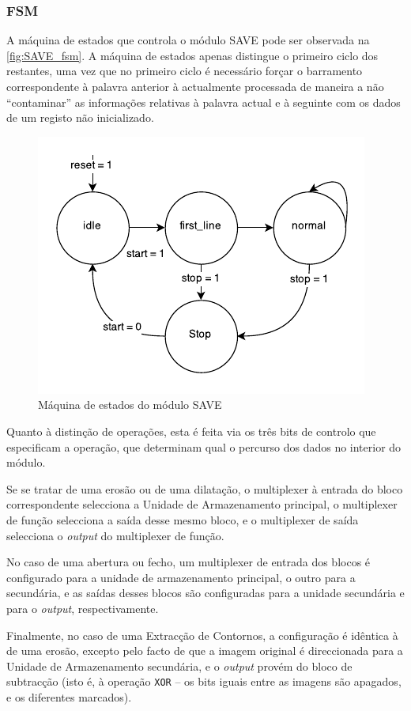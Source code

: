 \documentclass[a4paper]{article}
\begin{document}
\subsubsection{FSM}

A máquina de estados que controla o módulo SAVE pode ser observada na \autoref{fig:SAVE_fsm}. A máquina de estados apenas distingue o primeiro ciclo dos restantes, uma vez que no primeiro ciclo é necessário forçar o barramento correspondente à palavra anterior à actualmente processada de maneira a não ``contaminar'' as informações relativas à palavra actual e à seguinte com os dados de um registo não inicializado.

\begin{figure}[h]
	\centering
	\includegraphics[width=0.6\linewidth]{SAVE_fsm}
	\caption{Máquina de estados do módulo SAVE}
	\label{fig:SAVE_fsm}
\end{figure}

Quanto à distinção de operações, esta é feita via os três bits de controlo que especificam a operação, que determinam qual o percurso dos dados no interior do módulo.

Se se tratar de uma erosão ou de uma dilatação, o multiplexer à entrada do bloco correspondente selecciona a Unidade de Armazenamento principal, o multiplexer de função selecciona a saída desse mesmo bloco, e o multiplexer de saída selecciona o \textit{output} do multiplexer de função.

No caso de uma abertura ou fecho, um multiplexer de entrada dos blocos é configurado para a unidade de armazenamento principal, o outro para a secundária, e as saídas desses blocos são configuradas para a unidade secundária e para o \textit{output}, respectivamente.

Finalmente, no caso de uma Extracção de Contornos, a configuração é idêntica à de uma erosão, excepto pelo facto de que a imagem original é direccionada para a Unidade de Armazenamento secundária, e o \textit{output} provém do bloco de subtracção (isto é, à operação \texttt{XOR} -- os bits iguais entre as imagens são apagados, e os diferentes marcados).
\end{document}
